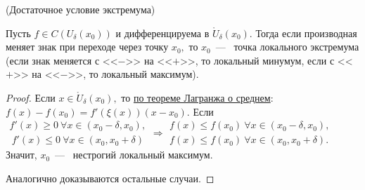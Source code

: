 \begin{theorem}
	\hypertarget{thrm5.22}{(Достаточное условие экстремума)} Пусть $f \in C(U_{\delta}(x_{0}))$ и дифференцируема в $\mathring{U}_{\delta}(x_{0})$. Тогда если производная меняет знак при переходе через точку $x_{0},$ то $x_{0}$~---~ точка локального экстремума (если знак меняется с <<$-$>> на <<$+$>>, то локальный минумум, если с <<$+$>> на <<$-$>>, то локальный максимум). 
\end{theorem}
\begin{proof}
	Если $x\in \mathring{U}_{\delta}(x_{0}),$ то \hyperlink{thrm5.11cor}{по теореме Лагранжа о среднем}: $f(x) - f(x_{0}) = f'(\xi(x))(x-x_{0}).$ Если $\begin{gathered}
		f'(x) \geq 0 \ \forall x\in (x_{0}-\delta, x_{0}), \\
		 \ f'(x) \leq 0 \ \forall x\in (x_{0}, x_{0} + \delta) 
	\end{gathered} \Rightarrow 
	\begin{gathered}
		 f(x) \leq f(x_{0}) \ \forall x\in (x_{0} -\delta, x_{0}), \\
		 f(x) \leq f(x_{0}) \ \forall x \in (x_{0}, x_{0} + \delta).
	\end{gathered}$
	Значит, $x_{0}$~---~ нестрогий локальный максимум.
	
	Аналогично доказываются остальные случаи.
\end{proof}

